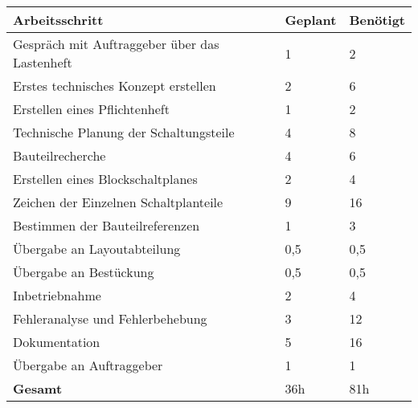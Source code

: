 \begin{tabularx}{\textwidth}{p{}|  p{} | p{}}

\textbf{Arbeitsschritt} 	&	\textbf{Geplant}	&	\textbf{Benötigt}	\\

\hline

Gespräch mit Auftraggeber über das Lastenheft	&	1	&	2\\

\hline

Erstes technisches Konzept erstellen			&	2	&	6\\

\hline

Erstellen eines Pflichtenheft					&	1	&	2\\

\hline 

Technische Planung der Schaltungsteile			&	4	&	8\\

\hline 

Bauteilrecherche  								&	4	&	6\\

\hline
\hline

Erstellen eines Blockschaltplanes				&	2	&	4\\

\hline

Zeichen der Einzelnen Schaltplanteile			&	9	&	16\\

\hline 

Bestimmen der Bauteilreferenzen					&	1	&	3\\

\hline

Übergabe an Layoutabteilung						&	0,5	&	0,5\\

\hline

Übergabe an Bestückung							&	0,5	&	0,5\\

\hline
\hline

Inbetriebnahme									&	2	&	4\\

\hline

Fehleranalyse und Fehlerbehebung				&	3	&	12\\

\hline 

Dokumentation									&	5	&	16\\

\hline

Übergabe an Auftraggeber						&	1	&	1\\

\hline
\hline

\textbf{Gesamt}	&	36h		&	81h

\end{tabularx}
\renewcommand{\arraystretch}{1}